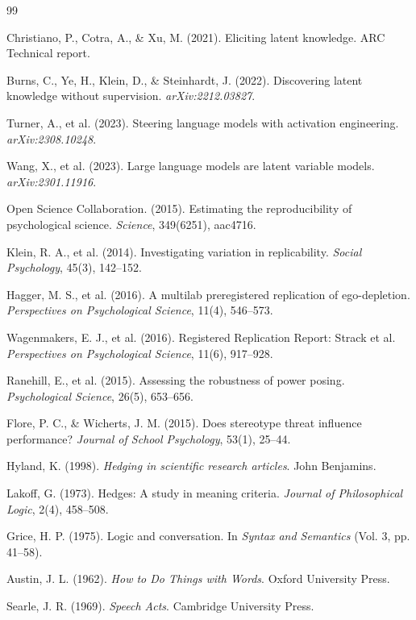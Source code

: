 \begin{thebibliography}{99}

Christiano, P., Cotra, A., \& Xu, M. (2021). Eliciting latent knowledge. ARC Technical report.

Burns, C., Ye, H., Klein, D., \& Steinhardt, J. (2022). Discovering latent knowledge without supervision. \emph{arXiv:2212.03827}.

Turner, A., et al. (2023). Steering language models with activation engineering. \emph{arXiv:2308.10248}.

Wang, X., et al. (2023). Large language models are latent variable models. \emph{arXiv:2301.11916}.

Open Science Collaboration. (2015). Estimating the reproducibility of psychological science. \emph{Science}, 349(6251), aac4716.

Klein, R. A., et al. (2014). Investigating variation in replicability. \emph{Social Psychology}, 45(3), 142--152.

Hagger, M. S., et al. (2016). A multilab preregistered replication of ego-depletion. \emph{Perspectives on Psychological Science}, 11(4), 546--573.

Wagenmakers, E. J., et al. (2016). Registered Replication Report: Strack et al. \emph{Perspectives on Psychological Science}, 11(6), 917--928.

Ranehill, E., et al. (2015). Assessing the robustness of power posing. \emph{Psychological Science}, 26(5), 653--656.

Flore, P. C., \& Wicherts, J. M. (2015). Does stereotype threat influence performance? \emph{Journal of School Psychology}, 53(1), 25--44.

Hyland, K. (1998). \emph{Hedging in scientific research articles}. John Benjamins.

Lakoff, G. (1973). Hedges: A study in meaning criteria. \emph{Journal of Philosophical Logic}, 2(4), 458--508.

Grice, H. P. (1975). Logic and conversation. In \emph{Syntax and Semantics} (Vol. 3, pp. 41--58).

Austin, J. L. (1962). \emph{How to Do Things with Words}. Oxford University Press.

Searle, J. R. (1969). \emph{Speech Acts}. Cambridge University Press.


\end{thebibliography}
